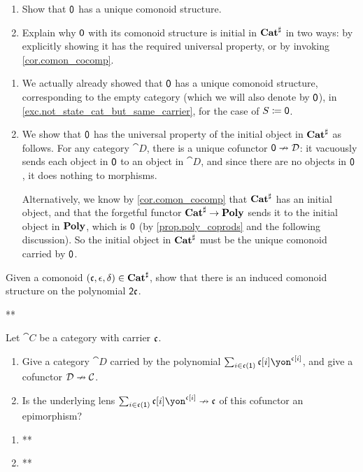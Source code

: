 \documentclass[Book-Poly]{subfiles}
\begin{document}
\begin{exercise}\label{exc.0_initial_com}
\begin{enumerate}
	\item Show that $\textsf{0}$ has a unique comonoid structure.
	\item Explain why $\textsf{0}$ with its comonoid structure is initial in $\mathbf{Cat}^\sharp$ in two ways: by explicitly showing it has the required universal property, or by invoking \cref{cor.comon_cocomp}.
\qedhere
\end{enumerate}
\begin{solution}
\begin{enumerate}
    \item We actually already showed that $\textsf{0}$ has a unique comonoid structure, corresponding to the empty category (which we will also denote by $\textsf{0}$), in \cref{exc.not_state_cat_but_same_carrier}, for the case of $S\coloneqq\textsf{0}$.
    \item We show that $\textsf{0}$ has the universal property of the initial object in $\mathbf{Cat}^\sharp$ as follows.
    For any category $\cat{D}$, there is a unique cofunctor $\textsf{0}\nrightarrow\mathcal{D}$: it vacuously sends each object in $\textsf{0}$ to an object in $\cat{D}$, and since there are no objects in $\textsf{0}$, it does nothing to morphisms.
    
    Alternatively, we know by \cref{cor.comon_cocomp} that $\mathbf{Cat}^\sharp$ has an initial object, and that the forgetful functor $\mathbf{Cat}^\sharp\to\mathbf{Poly}$ sends it to the initial object in $\mathbf{Poly}$, which is $\textsf{0}$ (by \cref{prop.poly_coprods} and the following discussion).
    So the initial object in $\mathbf{Cat}^\sharp$ must be the unique comonoid carried by $\textsf{0}$.
\end{enumerate}
\end{solution}
\end{exercise}

\begin{exercise}
Given a comonoid $(\mathfrak{c},\epsilon,\delta)\in\mathbf{Cat}^\sharp$, show that there is an induced comonoid structure on the polynomial $\textsf{2}\mathfrak{c}$.
\begin{solution}
** %
\end{solution}
\end{exercise}

\begin{exercise}
Let $\cat{C}$ be a category with carrier $\mathfrak{c}$.
\begin{enumerate}
	\item Give a category $\cat{D}$ carried by the polynomial $\sum_{i\in\car{c}(\1)}\car{c}[i]\yon^{\car{c}[i]}$, and give a cofunctor $\mathcal{D}\nrightarrow\mathcal{C}$.
	\item Is the underlying lens $\sum_{i\in\car{c}(\1)}\car{c}[i]\yon^{\car{c}[i]}\cof\car{c}$ of this cofunctor an epimorphism?
\qedhere
\end{enumerate}
\begin{solution}
\begin{enumerate}
    \item **
    \item **
\end{enumerate}
\end{solution}
\end{exercise}
\end{document}

